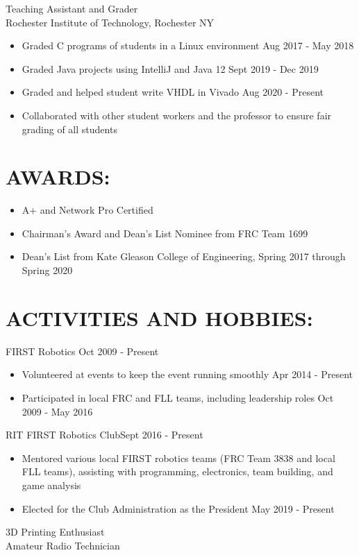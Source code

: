 \documentclass[line,margin]{res}
\begin{document}
\begin{resume}
		Teaching Assistant and Grader\\
		Rochester Institute of Technology, Rochester NY
		\begin{itemize}
			\item Graded C programs of students in a Linux environment \hfill Aug 2017 - May 2018
			\item Graded Java projects using IntelliJ and Java 12 \hfill Sept 2019 - Dec 2019
			\item Graded and helped student write VHDL in Vivado \hfill Aug 2020 - Present
			\item Collaborated with other student workers and the professor to ensure fair grading of all students
		\end{itemize}

	\section{AWARDS:}
		\begin{itemize}
			\setlength{\itemindent}{-15pt}
			\item A+ and Network Pro Certified
			\item Chairman's Award and Dean's List Nominee from FRC Team 1699
			\item Dean's List from Kate Gleason College of Engineering, Spring 2017 through Spring 2020
		\end{itemize}

	\section{ACTIVITIES AND HOBBIES:}

		FIRST Robotics \hfill Oct 2009 - Present
		\begin{itemize}
			\item Volunteered at events to keep the event running smoothly \hfill Apr 2014 - Present
			\item Participated in local FRC and FLL teams, including leadership roles \hfill Oct 2009 - May 2016
		\end{itemize}
		\vspace{-8pt}

		RIT FIRST Robotics Club\hfill Sept 2016 - Present
		\begin{itemize}
			\item Mentored various local FIRST robotics teams (FRC Team 3838 and local FLL teams), assisting with programming, electronics, team building, and game analysis
			\item Elected for the Club Administration as the President \hfill May 2019 - Present
		\end{itemize}

		3D Printing Enthusiast \\
		Amateur Radio Technician
\end{resume}
\end{document}
